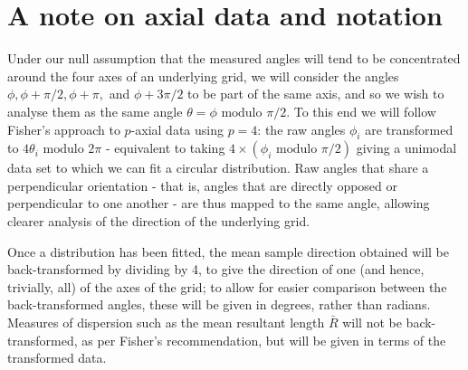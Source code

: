 \documentclass[10pt,fleqn]{article}
\begin{document}
\section*{A note on axial data and notation}
Under our null assumption that the measured angles will tend to be concentrated around the four axes of an underlying grid, we will consider the angles $\phi, \phi + \pi/2, \phi + \pi,$ and $\phi + 3\pi/2$ to be part of the same axis, and so we wish to analyse them as the same angle $\theta = \phi \text{ modulo }\pi/2$.
To this end we will follow Fisher's approach to $p$-axial data \cite{Fisher1993} using $p=4$: the raw angles $\phi_i$ are transformed to $4\theta_i \text{ modulo } 2\pi$ - equivalent to taking $4 \times (\phi_i \text{ modulo }\pi/2)$ giving a unimodal data set to which we can fit a circular distribution. Raw angles that share a perpendicular orientation - that is, angles that are directly opposed or perpendicular to one another - are thus mapped to the same angle, allowing clearer analysis of the direction of the underlying grid.

Once a distribution has been fitted, the mean sample direction obtained will be back-transformed by dividing by 4, to give the direction of one (and hence, trivially, all) of the axes of the grid; to allow for easier comparison between the back-transformed angles, these will be given in degrees, rather than radians. Measures of dispersion such as the mean resultant length $\bar{R}$ will not be back-transformed, as per Fisher's recommendation, but will be given in terms of the transformed data.

\newpage

























\newpage
\printbibliography
\end{document}
